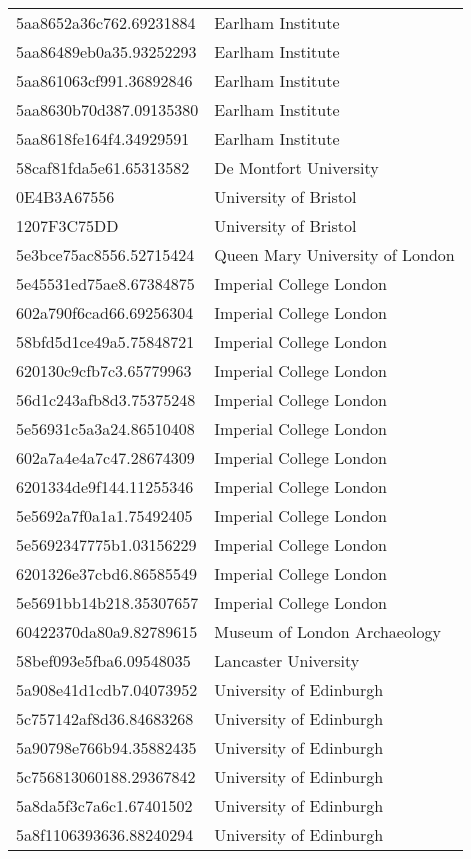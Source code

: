 \begin{tabular}{ll}
5aa8652a36c762.69231884 & Earlham Institute \\
5aa86489eb0a35.93252293 & Earlham Institute \\
5aa861063cf991.36892846 & Earlham Institute \\
5aa8630b70d387.09135380 & Earlham Institute \\
5aa8618fe164f4.34929591 & Earlham Institute \\
58caf81fda5e61.65313582 & De Montfort University \\
0E4B3A67556 & University of Bristol \\
1207F3C75DD & University of Bristol \\
5e3bce75ac8556.52715424 & Queen Mary University of London \\
5e45531ed75ae8.67384875 & Imperial College London \\
602a790f6cad66.69256304 & Imperial College London \\
58bfd5d1ce49a5.75848721 & Imperial College London \\
620130c9cfb7c3.65779963 & Imperial College London \\
56d1c243afb8d3.75375248 & Imperial College London \\
5e56931c5a3a24.86510408 & Imperial College London \\
602a7a4e4a7c47.28674309 & Imperial College London \\
6201334de9f144.11255346 & Imperial College London \\
5e5692a7f0a1a1.75492405 & Imperial College London \\
5e5692347775b1.03156229 & Imperial College London \\
6201326e37cbd6.86585549 & Imperial College London \\
5e5691bb14b218.35307657 & Imperial College London \\
60422370da80a9.82789615 & Museum of London Archaeology \\
58bef093e5fba6.09548035 & Lancaster University \\
5a908e41d1cdb7.04073952 & University of Edinburgh \\
5c757142af8d36.84683268 & University of Edinburgh \\
5a90798e766b94.35882435 & University of Edinburgh \\
5c756813060188.29367842 & University of Edinburgh \\
5a8da5f3c7a6c1.67401502 & University of Edinburgh \\
5a8f1106393636.88240294 & University of Edinburgh \\

\end{tabular}
